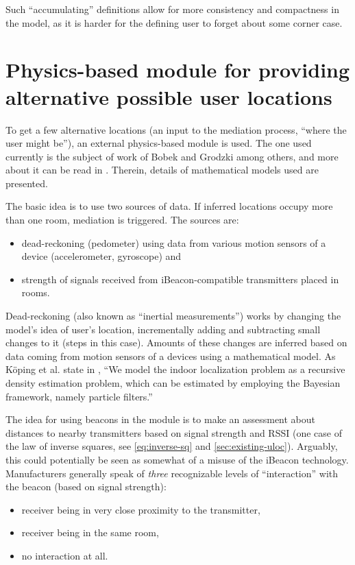 Such ``accumulating'' definitions allow for more consistency and compactness in the model, as it is harder for the defining user to forget about some corner case.

\section{Physics-based module for providing alternative possible user locations}
\label{sec:physics-module}

To get a few alternative locations (an input to the mediation process, ``where the user might be''), an external physics-based module is used. The one used currently is the subject of work of Bobek and Grodzki among others, and more about it can be read in \cite{bobek2015indoor, Koeping2015indoor}. Therein, details of mathematical models used are presented.

The basic idea is to use two sources of data. If inferred locations occupy more than one room, mediation is triggered. The sources are:

\begin{itemize}
	\item dead-reckoning (pedometer) using data from various motion sensors of a device (accelerometer, gyroscope) and
	\item strength of signals received from iBeacon-compatible transmitters placed in rooms.
\end{itemize}

Dead-reckoning (also known as ``inertial measurements'') works by changing the model's idea of user's location, incrementally adding and subtracting small changes to it (steps in this case). Amounts of these changes are inferred based on data coming from motion sensors of a devices using a mathematical model. As Köping et al. state in \cite{Koeping2015indoor}, ``We model the indoor localization problem as a recursive density estimation problem, which can be estimated by employing the Bayesian framework, namely particle filters.''

The idea for using beacons in the module is to make an assessment about distances to nearby transmitters based on signal strength and RSSI (one case of the law of inverse squares, see \cref{eq:inverse-sq} and \cref{sec:existing-uloc}). Arguably, this could potentially be seen as somewhat of a misuse of the iBeacon technology. Manufacturers generally speak of \emph{three} recognizable levels of ``interaction'' with the beacon (based on signal strength): \begin{itemize}
 	\item receiver being in very close proximity to the transmitter,
 	\item receiver being in the same room,
 	\item no interaction at all.
 \end{itemize}

